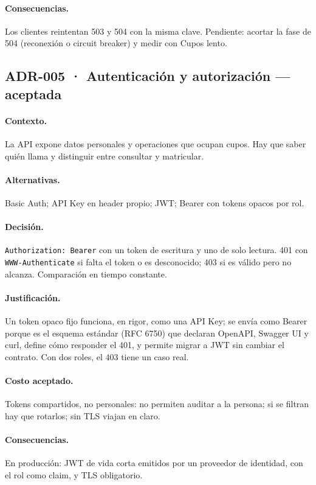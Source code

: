 \documentclass[11pt,spanish]{article}
\begin{document}
\paragraph{Consecuencias.} Los clientes reintentan 503 y 504 con la misma clave. Pendiente: acortar la fase de 504 (reconexión o circuit breaker) y medir con Cupos lento.

\subsection*{ADR-005 · Autenticación y autorización — aceptada}

\paragraph{Contexto.} La API expone datos personales y operaciones que ocupan cupos. Hay que saber quién llama y distinguir entre consultar y matricular.

\paragraph{Alternativas.} Basic Auth; API Key en header propio; JWT; Bearer con tokens opacos por rol.

\paragraph{Decisión.} \texttt{Authorization: Bearer} con un token de escritura y uno de solo lectura. 401 con \texttt{WWW-Authenticate} si falta el token o es desconocido; 403 si es válido pero no alcanza. Comparación en tiempo constante.

\paragraph{Justificación.} Un token opaco fijo funciona, en rigor, como una API Key; se envía como Bearer porque es el esquema estándar (RFC 6750) que declaran OpenAPI, Swagger UI y curl, define cómo responder el 401, y permite migrar a JWT sin cambiar el contrato. Con dos roles, el 403 tiene un caso real.

\paragraph{Costo aceptado.} Tokens compartidos, no personales: no permiten auditar a la persona; si se filtran hay que rotarlos; sin TLS viajan en claro.

\paragraph{Consecuencias.} En producción: JWT de vida corta emitidos por un proveedor de identidad, con el rol como claim, y TLS obligatorio.
\end{document}

